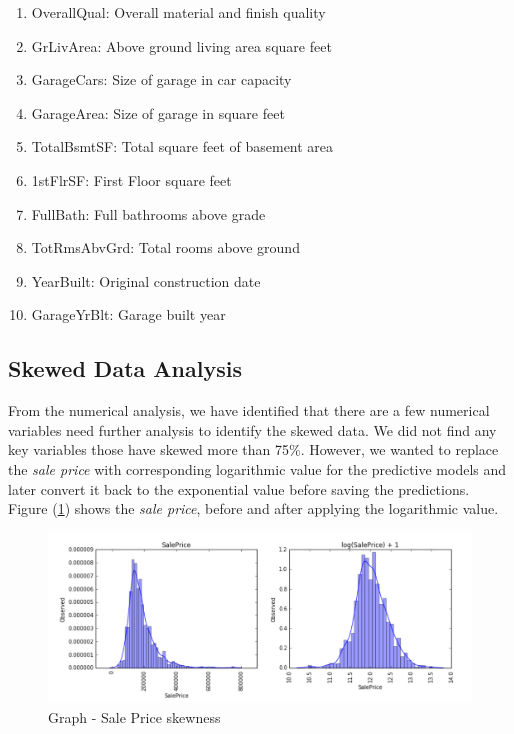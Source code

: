 \documentclass[sigconf]{acmart}
\begin{document}
	\begin{enumerate}
		\item OverallQual: Overall material and finish quality
		\item GrLivArea: Above ground living area square feet
		\item GarageCars: Size of garage in car capacity
		\item GarageArea: Size of garage in square feet
		\item TotalBsmtSF: Total square feet of basement area
		\item 1stFlrSF: First Floor square feet
		\item FullBath: Full bathrooms above grade
		\item TotRmsAbvGrd: Total rooms above ground
		\item YearBuilt: Original construction date
		\item GarageYrBlt: Garage built year		
	\end{enumerate}
	
	\subsection{Skewed Data Analysis}
	From the numerical analysis, we have identified that there are a few numerical variables need further analysis to identify the skewed data. We did not find any key variables those have skewed more than 75\%. However, we wanted to replace the {\em sale price} with corresponding logarithmic value for the predictive models and later convert it back to the exponential value before saving the predictions. Figure (\ref{fig:sale-price-skew}) shows the {\em sale price}, before and after applying the logarithmic value. 
	
	\begin{figure}[htb]
		\centering
		\includegraphics[width=1.0\columnwidth]{images/sale_price_skew}	
		\caption{Graph - Sale Price skewness} \label{fig:sale-price-skew} 
	\end{figure}
	
\end{document}
